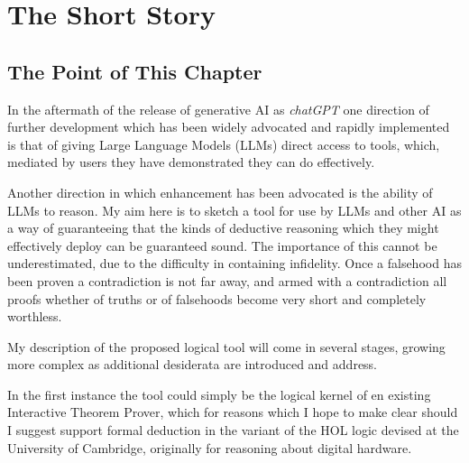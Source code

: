 \chapter{The Short Story}\label{ShortStory}

\section{The Point of This Chapter}

In the aftermath of the release of generative AI as \emph{chatGPT} one direction of further development which has been widely advocated and rapidly implemented is that of giving Large Language Models (LLMs) direct access to tools, which, mediated by users they have demonstrated they can do effectively.

Another direction in which enhancement has been advocated is the ability of LLMs to reason.
My aim here is to sketch a tool for use by LLMs and other AI as a way of guaranteeing that the kinds of deductive reasoning which they might effectively deploy can be guaranteed sound.
The importance of this cannot be underestimated, due to the difficulty in containing infidelity.
Once a falsehood has been proven a contradiction is not far away, and armed with a contradiction all proofs whether of truths or of falsehoods become very short and completely worthless.

My description of the proposed logical tool will come in several stages, growing more complex as additional desiderata are introduced and address.

In the first instance the tool could simply be the logical kernel of en existing Interactive Theorem Prover, which for reasons which I hope to make clear should I suggest support formal deduction in the variant of the HOL logic devised at the University of Cambridge, originally for reasoning about digital hardware.








